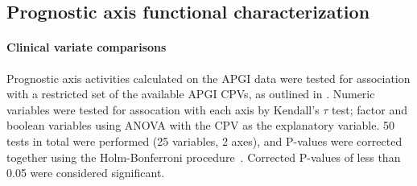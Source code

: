 \documentclass[dissertation.tex]{subfiles}
\begin{document}
\subsection{Prognostic axis functional characterization}
\paragraph{Clinical variate comparisons}
Prognostic axis activities calculated on the \gls{APGI} data were tested for association with a restricted set of the available \gls{APGI} \glspl{CPV}, as outlined in .  Numeric variables were tested for assocation with each axis by Kendall's $\tau$ test; factor and boolean variables using ANOVA with the \gls{CPV} as the explanatory variable.  50 tests in total were performed (25 variables, 2 axes), and P-values were corrected together using the Holm-Bonferroni procedure~\cite{Holm1979}.  Corrected P-values of less than 0.05 were considered significant.
\end{document}
